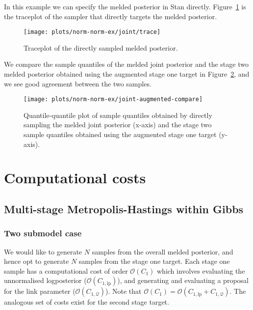 \documentclass[10pt,a4paper,]{article}
\newcommand{\Nx}{N}
\begin{document}
In this example we can specify the melded posterior in Stan directly.
Figure~\ref{fig:joint_trace} is the traceplot of the sampler that
directly targets the melded posterior.

\begin{figure}

{\centering \texttt{[image: plots/norm-norm-ex/joint/trace]} 

}

\caption{Traceplot of the directly sampled melded posterior.}\label{fig:joint_trace}
\end{figure}

We compare the sample quantiles of the melded joint posterior and the
stage two melded posterior obtained using the augmented stage one target
in Figure~\ref{fig:joint_augmented_compare}, and we see good agreement
between the two samples.

\begin{figure}

{\centering \texttt{[image: plots/norm-norm-ex/joint-augmented-compare]} 

}

\caption{Quantile-quantile plot of sample quantiles obtained by directly sampling the melded joint posterior (x-axis) and the stage two sample quantiles obtained using the augmented stage one target (y-axis).}\label{fig:joint_augmented_compare}
\end{figure}

\section{Computational costs}\label{computational-costs}

\subsection{Multi-stage Metropolis-Hastings within
Gibbs}\label{multi-stage-metropolis-hastings-within-gibbs}

\subsubsection*{Two submodel case}\label{two-submodel-case}

We would like to generate \(\Nx\) samples from the overall melded
posterior, and hence opt to generate \(\Nx\) samples from the stage one
target. Each stage one sample has a computational cost of order
\(\mathcal{O}(C_{1})\) which involves evaluating the unnormalised
logposterior (\(\mathcal{O}(C_{1, \text{lp}})\)), and generating and
evaluating a proposal for the link parameter
(\(\mathcal{O}(C_{1, \mathcal{Q}})\)). Note that
\(\mathcal{O}(C_{1}) = \mathcal{O}(C_{1, \text{lp}} + C_{1, \mathcal{Q}})\).
The analogous set of costs exist for the second stage target.
\end{document}
